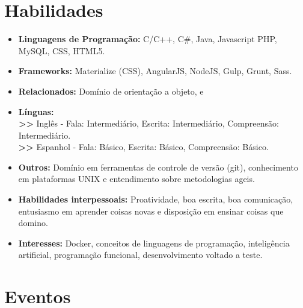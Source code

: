 \documentclass[11pt,a4paper,sans]{moderncv}        %
\begin{document}
\section{Habilidades}

\vspace{6pt}

\begin{itemize}

\item \textbf{Linguagens de Programação:} C/C++, C\#, Java, Javascript PHP, MySQL, CSS, HTML5.
\item \textbf{Frameworks:} Materialize (CSS), AngularJS, NodeJS, Gulp, Grunt, Sass.
\item \textbf{Relacionados:} Domínio de orientação a objeto, e 
\vspace{6pt}

\item \textbf{Línguas:}
\\\textbf{>>} Inglês - Fala: Intermediário, Escrita: Intermediário, Compreensão: Intermediário. 
\\\textbf{>>} Espanhol - Fala: Básico, Escrita: Básico, Compreensão: Básico.  

\vspace{6pt}

\item \textbf{Outros:} Domínio em ferramentas de controle de versão (git), conhecimento em plataformas UNIX e entendimento sobre metodologias ageis.

\vspace{6pt}

\item \textbf{Habilidades interpessoais:} Proatividade, boa escrita, boa comunicação, entusiasmo em aprender coisas novas e disposição em ensinar coisas que domino.


\vspace{6pt}

\item \textbf{Interesses:} Docker, conceitos de linguagens de programação, inteligência artificial, programação funcional, desenvolvimento voltado a teste. 

\end{itemize}


\section{Eventos}

\vspace{6pt}
 
\end{document}
